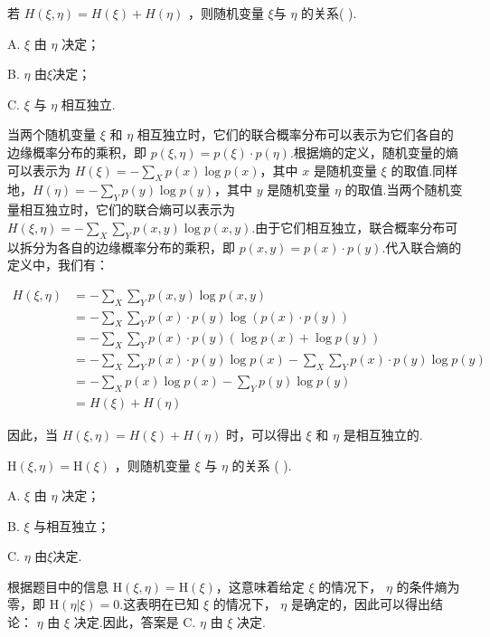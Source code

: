 \begin{tcolorbox}[breakable,colback=blue!5!white,colframe=blue!75!black,
 title= 单选题]
若 $ H(\xi, \eta)=H(\xi)+H(\eta) $ ，则随机变量 $ \xi $与 $\eta$ 的关系(  ).

A. $ \xi $ 由 $ \eta $ 决定；

B. $ \eta $ 由$ \xi $决定；

C. $ \xi $ 与 $ \eta $ 相互独立.

  \tcblower

当两个随机变量 $\xi$ 和 $\eta$ 相互独立时，它们的联合概率分布可以表示为它们各自的边缘概率分布的乘积，即 $p(\xi, \eta) = p(\xi) \cdot p(\eta)$.根据熵的定义，随机变量的熵可以表示为 $H(\xi) = -\sum\limits_{{X}} p(x) \log p(x)$，其中 $x$ 是随机变量 $\xi$ 的取值.同样地，$H(\eta) = -\sum\limits_{{Y}} p(y) \log p(y)$，其中 $y$ 是随机变量 $\eta$ 的取值.当两个随机变量相互独立时，它们的联合熵可以表示为 $H(\xi, \eta) = -\sum\limits_{X}\sum\limits_{Y} p(x, y) \log p(x, y)$.由于它们相互独立，联合概率分布可以拆分为各自的边缘概率分布的乘积，即 $p(x, y) = p(x) \cdot p(y)$.代入联合熵的定义中，我们有：

$$
\begin{aligned}
H(\xi, \eta) &= -\sum_{X}\sum_{Y} p(x, y) \log p(x, y) \\
&= -\sum_{{X}}\sum_{Y} p(x) \cdot p(y) \log (p(x) \cdot p(y)) \\
&= -\sum_{X}\sum_{Y} p(x) \cdot p(y) (\log p(x) + \log p(y)) \\
&= -\sum_{X}\sum_{Y} p(x) \cdot p(y) \log p(x) - \sum_{X}\sum_{Y} p(x) \cdot p(y) \log p(y) \\
&= -\sum_{X} p(x) \log p(x) - \sum_{Y} p(y) \log p(y) \\
&= H(\xi) + H(\eta)
\end{aligned}
$$

因此，当 $H(\xi, \eta) = H(\xi) + H(\eta)$ 时，可以得出 $\xi$ 和 $\eta$ 是相互独立的.

\end{tcolorbox}



\begin{tcolorbox}[breakable,colback=blue!5!white,colframe=blue!75!black,
 title= 单选题]
$  \mathrm{H}(\xi, \eta)=\mathrm{H}(\xi) $ ，则随机变量 $ \xi $ 与 $ \eta $ 的关系 ( ).

A. $ \xi $ 由 $ \eta $ 决定；

B. $ \xi $ 与相互独立；

C. $ \eta $ 由$ \xi $决定.
  \tcblower

根据题目中的信息 $ \mathrm{H}(\xi, \eta)=\mathrm{H}(\xi) $，这意味着给定 $ \xi $ 的情况下， $ \eta $ 的条件熵为零，即 $ \mathrm{H}(\eta|\xi) = 0 $.这表明在已知 $ \xi $ 的情况下， $ \eta $ 是确定的，因此可以得出结论： $ \eta $ 由 $ \xi $ 决定.因此，答案是 C. $ \eta $ 由 $ \xi $ 决定.

\end{tcolorbox}


